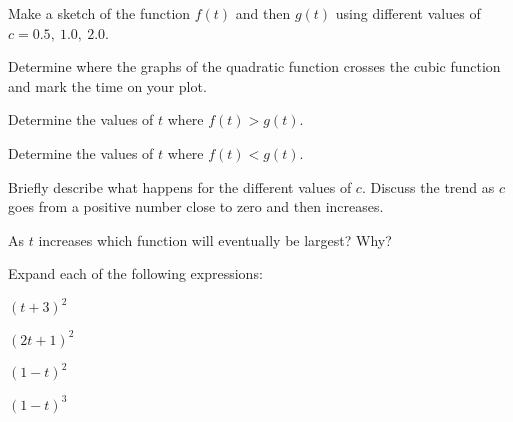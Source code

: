 \begin{problem}
  \scalebox{0.7}{}

  \begin{subproblem}
  \item Make a sketch of the function $f(t)$ and then $g(t)$
    using different values of $c=0.5,~1.0,~2.0$.
  \item Determine where the graphs of the quadratic function crosses the
    cubic function and mark the time on your plot.
    \clearpage
  \item Determine the values of $t$ where $f(t)>g(t)$.
    \vfill
  \item Determine the values of $t$ where $f(t)<g(t)$.
    \vfill
  \item Briefly describe what happens for the different values of
    $c$. Discuss the trend as $c$ goes from a positive number close to
    zero and then increases.
    \vfill
  \item As $t$ increases which function will eventually be largest?
    Why?
    \vfill
  \end{subproblem}


\end{problem}




\begin{problem}
\item Expand each of the following expressions:
  \begin{subproblem}
    \item $(t+3)^2$
      \vfill
    \item $(2t+1)^2$
      \vfill
    \item $(1-t)^2$
      \vfill
    \item $(1-t)^3$
      \vfill
  \end{subproblem}
\end{problem}


